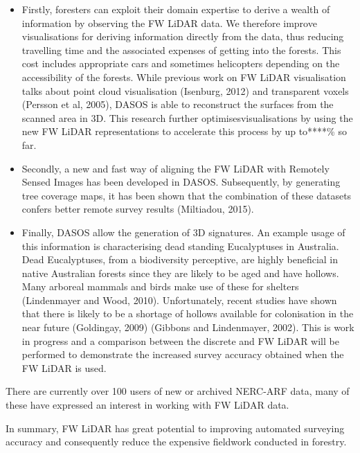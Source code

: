 \documentclass{subfiles}
\begin{document}
\begin{itemize}
\item Firstly, foresters can exploit their domain expertise to derive a wealth of information by observing the FW LiDAR data. We therefore improve visualisations for deriving information directly from the data, thus reducing travelling time and the associated expenses of getting into the forests. This cost includes appropriate cars and sometimes helicopters depending on the accessibility of the forests. While previous work on FW LiDAR visualisation talks about point cloud visualisation (Isenburg, 2012) and transparent voxels (Persson et al, 2005), DASOS is able to reconstruct the surfaces from the scanned area in 3D. This research further optimisesvisualisations by using the new FW LiDAR representations to accelerate this process by up to****\% so far.

\item Secondly, a new and fast way of aligning the FW LiDAR with Remotely Sensed Images has been developed in DASOS. Subsequently, by generating tree coverage maps, it has been shown that the combination of these datasets confers better remote survey results (Miltiadou, 2015).

\item Finally, DASOS allow the generation of 3D signatures. An example usage of this information is characterising dead standing Eucalyptuses in Australia. Dead Eucalyptuses, from a biodiversity perceptive, are highly beneficial in native Australian forests since they are likely to be aged and have hollows. Many arboreal mammals and birds make use of these for shelters (Lindenmayer and Wood, 2010). Unfortunately, recent studies have shown that there is likely to be a shortage of hollows available for colonisation in the near future (Goldingay, 2009) (Gibbons and Lindenmayer, 2002). This is work in progress and a comparison between the discrete and FW LiDAR will be performed to demonstrate the increased survey accuracy obtained when the FW LiDAR is used.

\end{itemize}

\par There are currently over 100 users of new or archived NERC-ARF data, many of these have expressed an interest in working with FW LiDAR data.

\par In summary, FW LiDAR has great potential to improving automated surveying accuracy and consequently reduce the expensive fieldwork conducted in forestry. 
\end{document}
